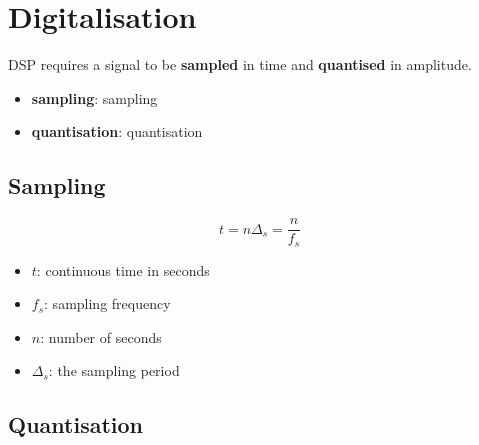 \section{Digitalisation}

  DSP requires a signal to be \textbf{sampled} in time and \textbf{quantised}
  in amplitude.

  \begin{itemize}
    \item \textbf{\Gls{sampling}}: \glsdesc{sampling}
    \item \textbf{\Gls{quantisation}}: \glsdesc{quantisation}
  \end{itemize}

  \subsection{Sampling}

    \begin{equation}
      t = n \Delta_{s} = \frac{n}{f_{s}}
    \end{equation}

    \begin{itemize}
      \item $ t $: continuous time in seconds
      \item $ f_{s} $: sampling frequency
      \item $ n $: number of seconds
      \item $ \Delta_{s} $: the sampling period
    \end{itemize}

  \subsection{Quantisation}

